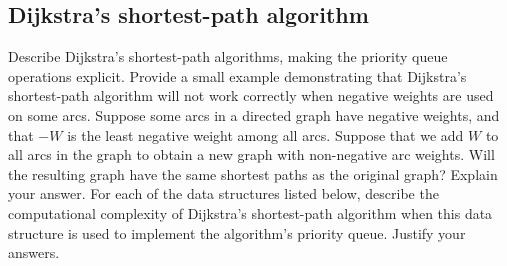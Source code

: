 \documentclass[10pt,a4paper]{exam}
\begin{document}
\begin{questions}

\section{Dijkstra's shortest-path algorithm}

\question[4] Describe Dijkstra's shortest-path algorithms, making the priority queue operations explicit. \droppoints
\question[3] Provide a small example demonstrating that Dijkstra's shortest-path algorithm will not work correctly when negative weights are used on some arcs. \droppoints 
\question[3] Suppose some arcs in a directed graph have negative weights, and that ${-W}$ is the least negative weight among all arcs. Suppose that we add $W$ to all arcs in the graph to obtain a new graph with non-negative arc weights. Will the resulting graph have the same shortest paths as the original graph? Explain your answer. \droppoints 
\question For each of the data structures listed below, describe the computational complexity of Dijkstra's shortest-path algorithm when this data structure is used to implement the algorithm's priority queue. Justify your answers.


\end{questions}
\end{document}
